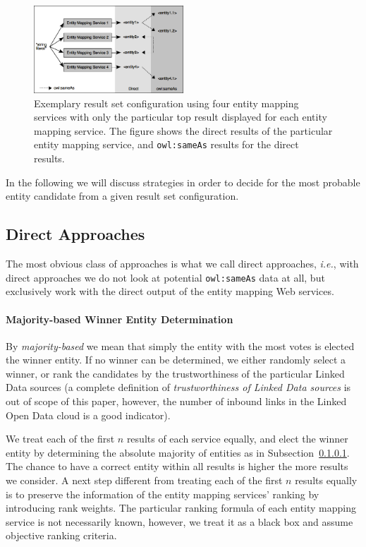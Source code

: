 \documentclass[twocolumn]{article}
\begin{document}
\begin{figure}
 \centering
 \includegraphics[width=0.5\textwidth]{diagram.png}
 \caption{Exemplary result set configuration using four entity mapping services with only the particular top result displayed for each entity mapping service. The figure shows the direct results of the particular entity mapping service, and \texttt{owl:sameAs} results for the direct results.}
 \label{fig:diagram}
\end{figure}

In the following we will discuss strategies in order to decide for the most probable entity candidate from a given
result set configuration.

\subsection{Direct Approaches}
The most obvious class of approaches is what we call direct approaches, \emph{i.e.}, with direct approaches we do not look at potential \texttt{owl:sameAs} data at all, but exclusively work with the direct output of the entity mapping Web services.

\paragraph{Majority-based Winner Entity Determination}\label{sec:direct}
By \textit{majority-based} we mean that simply the entity with the most votes is elected the winner entity. If no
winner can be determined, we either randomly select a winner, or rank the candidates by the trustworthiness of the
particular Linked Data sources (a complete definition of \textit{trustworthiness of Linked Data sources} is out of
scope of this paper, however, the number of inbound links in the Linked Open Data
cloud is a good indicator).

We treat each of the first $n$ results of each service equally, and elect the winner entity by determining the
absolute majority of entities as in Subsection~\ref{sec:direct}. The chance to have a correct entity within all results is
higher the more results we consider. A next step different from treating each of the first $n$
results equally is to preserve the information of the entity mapping services' ranking by introducing rank
weights. The particular ranking formula of each entity mapping service is not necessarily known, however, we treat it as a black box and assume objective ranking criteria.
\end{document}
